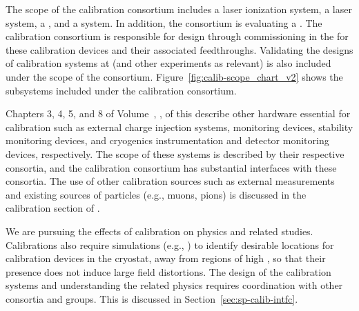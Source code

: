 
The scope of the calibration consortium includes a laser ionization system, a \phel laser system, a 
, 
and a  system. In addition, the consortium is evaluating a .
The calibration consortium is responsible for design through commissioning in the  for these calibration devices and their associated feedthroughs. Validating the designs of calibration systems at  (and other experiments as relevant) is also included under the scope of the consortium. Figure~\ref{fig:calib-scope_chart_v2} shows the subsystems included under the calibration consortium. 


Chapters 3, 4, 5, and 8 of Volume~\volnumbersp{}, \voltitlesp{}, of this  describe other hardware essential for calibration such as  external charge injection systems,  monitoring devices,  stability monitoring devices, and cryogenics instrumentation and detector monitoring devices, respectively. The scope of these systems is described by their respective consortia, and the calibration consortium has substantial interfaces with these consortia. 
The use of other calibration sources such as external measurements and existing sources of particles (e.g., muons, pions) is discussed in the calibration section of  \physchtools. 
 
We are pursuing the effects of calibration on physics and related studies. %
Calibrations also require simulations (e.g., \efield) to identify desirable locations for calibration devices in the cryostat, away from regions of high \efield, so that their presence does not induce large field distortions. 
The design of the calibration systems and understanding the related physics requires coordination with other consortia and groups. This is discussed in Section~\ref{sec:sp-calib-intfc}.

